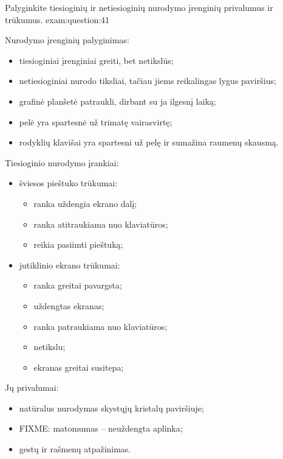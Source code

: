 \begin{question}{%
  Palyginkite tiesioginių ir netiesioginių nurodymo įrenginių privalumus
  ir trūkumus.
  }{exam:question:41}

  Nurodymo įrenginių palyginimas\cite[39]{skaidres-16}:
  \begin{itemize}
    \item tiesioginiai įrenginiai greiti, bet netikslūs;
    \item netiesioginiai nurodo tiksliai, tačiau jiems reikalingas
      lygus paviršius;
    \item grafinė planšetė patraukli, dirbant su ja ilgesnį laiką;
    \item pelė yra spartesnė už trimatę vairasvirtę;
    \item rodyklių klavišai yra spartesni už pelę ir sumažina raumenų
      skausmą.
  \end{itemize}

  Tiesioginio nurodymo įrankiai:
  \begin{itemize}
    \item šviesos pieštuko trūkumai\cite[30]{skaidres-16}:
      \begin{itemize}
        \item ranka uždengia ekrano dalį;
        \item ranka atitraukiama nuo klaviatūros;
        \item reikia pasiimti pieštuką;
      \end{itemize}
    \item jutiklinio ekrano 
      trūkumai\cite[31]{skaidres-16}:
      \begin{itemize}
        \item ranka greitai pavargsta;
        \item uždengtas ekranas;
        \item ranka patraukiama nuo klaviatūros;
        \item netikslu;
        \item ekranas greitai susitepa;
      \end{itemize}
  \end{itemize}
  Jų privalumai\cite[32]{skaidres-16}:
  \begin{itemize}
    \item natūralus nurodymas skystųjų kristalų paviršiuje;
    \item FIXME: matomumas – neuždengta aplinka;
    \item gestų ir rašmenų atpažinimas.
  \end{itemize}


\end{question}
